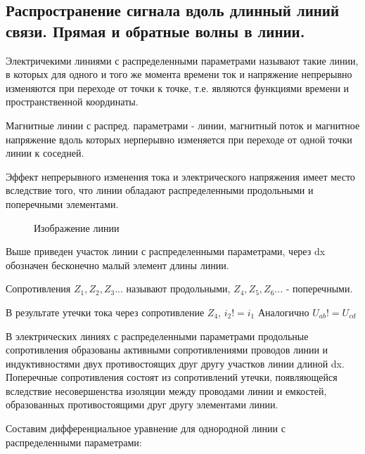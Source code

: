 \subsection{Распространение сигнала вдоль длинный линий связи. Прямая и обратные волны в линии.}

Электричекими линиями с распределенными параметрами называют такие линии, в которых для одного и того же момента времени ток и напряжение непрерывно изменяются при переходе от точки к точке, т.е. являются функциями времени и пространственной координаты.

Магнитные линии с распред. параметрами - линии, магнитный поток и магнитное напряжение вдоль которых нерперывно изменяется при переходе от одной точки линии к соседней.

Эффект непрерывного изменения тока и электрического напряжения имеет место вследствие того, что линии обладают распределенными продольными и поперечными элементами. 
\begin{center}
	\begin{figure}[h!]
		\caption{Изображение линии}	
		\end{figure}
\end{center}
Выше приведен участок линии с распределенными параметрами, через dx обозначен бесконечно малый элемент длины линии. 

Сопротивления $Z_{1},Z_{2},Z_{3} ...$ называют продольными, $Z_{4}, Z_{5}, Z_{6} ...$ - поперечными. 

В результате утечки тока через сопротивление $Z_4$, $i_2 != i_1$ Аналогично $U_{ab} != U_{cd}$

В электрических линиях с распределенными параметрами продольные сопротивления образованы активными сопротивлениями проводов линии и индуктивностями двух противостоящих друг другу участков линии длиной dx. Поперечные сопротивления состоят из сопротивлений утечки, появляющейся вследствие несовершенства изоляции между проводами линии и емкостей, образованных противостоящими друг другу элементами линии.

Составим дифференциальное уравнение для однородной линии с распределенными параметрами:
\begin{center}
	\begin{figure}[h!]
		\caption{}	
		\end{figure}
\end{center}



